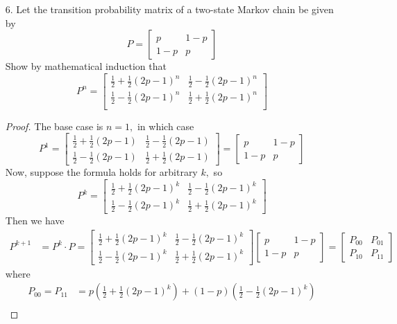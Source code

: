 \documentclass{article}
\begin{document}
\begin{itemize}
	\item[6.] Let the transition probability matrix of a two-state Markov chain be given by
		\[P=\begin{bmatrix}
				p & 1-p \\ 1-p & p
		\end{bmatrix}\]
		Show by mathematical induction that
		\[P^{n}=\begin{bmatrix}
				\frac{1}{2} + \frac{1}{2}(2p-1)^n & \frac{1}{2}-\frac{1}{2}(2p-1)^n \\
				\frac{1}{2} - \frac{1}{2}(2p-1)^n & \frac{1}{2}+\frac{1}{2}(2p-1)^n \\
		\end{bmatrix}\]
		\begin{proof}
			The base case is $n=1,$ in which case
			\[P^1=\begin{bmatrix}
					\frac{1}{2}+\frac{1}{2}(2p-1) & \frac{1}{2} - \frac{1}{2}(2p-1) \\
					\frac{1}{2}-\frac{1}{2}(2p-1) & \frac{1}{2} + \frac{1}{2}(2p-1) 
				\end{bmatrix} = \begin{bmatrix}
					p & 1-p \\
					1-p & p
			\end{bmatrix}\]
			Now, suppose the formula holds for arbitrary $k,$ so 
			\[P^k=\begin{bmatrix}
					\frac{1}{2} + \frac{1}{2}(2p-1)^k & \frac{1}{2}-\frac{1}{2}(2p-1)^k \\
					\frac{1}{2} - \frac{1}{2}(2p-1)^k & \frac{1}{2}+\frac{1}{2}(2p-1)^k
			\end{bmatrix}\]
			Then we have
			\begin{align*}
				P^{k+1} &= P^k \cdot P = \begin{bmatrix}
					\frac{1}{2} + \frac{1}{2}(2p-1)^k & \frac{1}{2}-\frac{1}{2}(2p-1)^k \\
					\frac{1}{2} - \frac{1}{2}(2p-1)^k & \frac{1}{2}+\frac{1}{2}(2p-1)^k
				\end{bmatrix}\begin{bmatrix}
					p & 1-p \\ 1-p & p
				\end{bmatrix} = \begin{bmatrix}
					P_{00} & P_{01} \\
					P_{10} & P_{11}
				\end{bmatrix}
			\end{align*}
			where
			\begin{align*}
				P_{00} = P_{11} &= p\left( \frac{1}{2}+\frac{1}{2}(2p-1)^k \right) + (1-p)\left( \frac{1}{2}-\frac{1}{2}(2p-1)^k \right) \\

\end{align*}
\end{proof}
\end{itemize}
\end{document}
